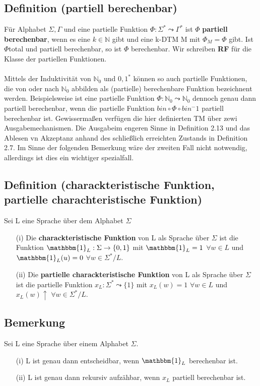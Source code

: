 \documentclass[a4paper,11pt]{article}
\begin{document}
\subsection{Definition (partiell berechenbar)}
Für Alphabet $\Sigma, \Gamma$ und eine partielle Funktion $\Phi : \Sigma^* \leadsto \Gamma^*$ ist $\Phi$ \textbf{partiell berechenbar}, wenn es eine $k \in \mathbb{N}$ gibt und eine k-DTM M mit $\Phi_M = \Phi$ gibt. Ist $\Phi $total und partiell berechenbar, so ist $\Phi$ berechenbar. Wir schreiben \textbf{RF} für die Klasse der partiellen Funktionen.\\\\Mittels der Induktivität von $\mathbb{N}_0$ und ${0, 1}^*$ können so auch partielle Funktionen, die von oder nach $\mathbb{N}_0$ abbilden als (partielle) berechenbare Funktion bezeichnent werden. Beispielsweise ist eine partielle Funktion $\Phi : \mathbb{N}_0 \leadsto \mathbb{N}_0$ dennoch genau dann partiell berechenbar, wenn die partielle Funktion $bin \circ \Phi \circ bin^-1$ partiell berechenbar ist. Gewissermaßen verfügen die hier definierten TM über zewi Ausgabemechanismen. Die Ausgabeim engeren Sinne in Definition 2.13 und das Ablesen vn Akzeptanz anhand des schließlich erreichten Zustands in Definition 2.7. Im Sinne der folgenden Bemerkung wäre der zweiten Fall nicht notwendig, allerdings ist dies ein wichtiger spezialfall.

\subsection{Definition (charackteristische Funktion, partielle charachteristische Funktion)} Sei L eine Sprache über dem Alphabet $\Sigma$
\begin{itemize}
  \item [(i)] Die \textbf{charackteristische Funktion} von L als Sprache über $\Sigma$ ist die Funktion $\mathbbm{1}_L : \Sigma \rightarrow \{0, 1\}$ mit $\mathbbm{1}_L = 1$ $\forall w \in L$ und $\mathbbm{1}_L (u) = 0$ $\forall w \in \Sigma^* / L$.
  \item [(ii)] Die \textbf{ partielle charackteristische Funktion} von L als Sprache über $\Sigma$ ist die partielle Funktion $x_L : \Sigma^* \leadsto \{1\}$ mit $x_L(w) = 1$ $\forall w \in L$ und $x_L(w) \uparrow$  $\forall w \in \Sigma^* / L.$ 
\end{itemize}

\subsection{Bemerkung} Sei L eine Sprache über einem Alphabet $\Sigma$. 
\begin{itemize}
  \item [(i)] L ist genau dann entscheidbar, wenn $\mathbbm{1}_L$ berechenbar ist.
  \item [(ii)] L ist genau dann rekursiv aufzähbar, wenn $x_L$ partiell berechenbar ist.
\end{itemize}
\end{document}
